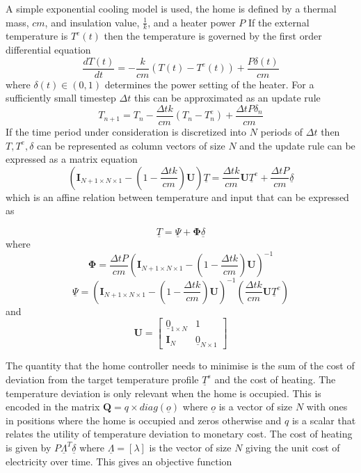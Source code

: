 \documentclass[a4paper, 10 pt, conference]{ieeeconf}  %
\begin{document}
A simple exponential cooling model is used, the home is defined by a thermal mass, $cm$, and insulation value, $\frac{1}{k}$, and a heater power $P$ If the external temperature is $T^{e}(t)$ then the temperature is governed by the first order differential equation
\begin{equation}
\frac{dT(t)}{dt} = -\frac{k}{cm}(T(t)-T^{e}(t)) +\frac{P\delta(t)}{cm}
\end{equation}
where $\delta(t) \in (0,1)$ determines the power setting of the heater. For a sufficiently small timestep $\Delta t$  this can be approximated as an update rule
\begin{equation}
T_{n+1} =  T_{n}-\frac{\Delta t k}{cm}(T_{n}-T_{n}^{e}) + \frac{\Delta t P \delta_{n}}{cm} 
\end{equation}
If the time period under consideration is discretized into $N$ periods of $\Delta t$ then $T, T^{e},\delta$ can be represented as column vectors of size $N$ and the update rule can be expressed as a matrix equation
\begin{equation}
\left( \mathbf{I}_{N+1 \times N \times 1}-(1-\frac{\Delta t k}{cm})\mathbf{U}\right) \underline{T} = \frac{\Delta t k}{cm}\mathbf{U}\underline{T}^{e}+\frac{\Delta t P}{cm}\underline{\delta}
\end{equation}
which is an affine relation between temperature and input that can be expressed as

\begin{equation}
\underline{T}=\underline{\Psi}+\boldsymbol{\Phi} \underline{\delta}
\end{equation}
where
\begin{equation}
\boldsymbol{\Phi}= \frac{\Delta t P}{cm} \left( \mathbf{I}_{N+1 \times N \times 1}-(1-\frac{\Delta t k}{cm})\mathbf{U}\right)^{-1}
\end{equation}
\begin{equation}
\underline{\Psi}= \left( \mathbf{I}_{N+1 \times N \times 1}-(1-\frac{\Delta t k}{cm})\mathbf{U}\right)^{-1} \left( \frac{\Delta t k}{cm}\mathbf{U}\underline{T}^{e}\right)
\end{equation}
and
\begin{equation}
\mathbf{U} = \left[
\begin{array}{c|c}
\underline{0}_{1\times N} & 1 \\ \hline
\mathbf{I}_{N} & \underline{0}_{N \times 1}
\end{array}\right]
\end{equation}

The quantity that the home controller needs to minimise is the sum of the cost of deviation from the target temperature profile $\underline{T}^s$ and the cost of heating. The temperature deviation is only relevant when the home is occupied. This is encoded in the matrix $\mathbf{Q}=q \times diag(\underline{o})$ where $\underline{o}$ is a vector of size $N$ with ones in positions where the home is occupied and zeros otherwise and $q$ is a scalar that relates the utility of temperature deviation to monetary cost. The cost of heating is given by $P\underline{\Lambda}^{T} \underline{\delta}$ where $\underline{\Lambda}=[ \lambda ]$ is the vector of size $N$ giving the unit cost of electricity over time. This gives an objective function
\end{document}
